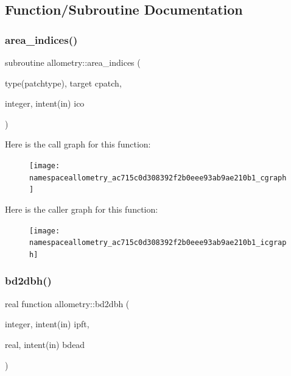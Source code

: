 \subsection{Function/\+Subroutine Documentation}
\mbox{\label{namespaceallometry_ac715c0d308392f2b0eee93ab9ae210b1}} 
\subsubsection{\texorpdfstring{area\+\_\+indices()}{area\_indices()}}
{\footnotesize\ttfamily subroutine allometry\+::area\+\_\+indices (\begin{DoxyParamCaption}\item[{type(patchtype), target}]{cpatch,  }\item[{integer, intent(in)}]{ico }\end{DoxyParamCaption})}

Here is the call graph for this function\+:
\nopagebreak
\begin{figure}[H]
\begin{center}
\leavevmode
\texttt{[image: namespaceallometry\_ac715c0d308392f2b0eee93ab9ae210b1\_cgraph]}
\end{center}
\end{figure}
Here is the caller graph for this function\+:
\nopagebreak
\begin{figure}[H]
\begin{center}
\leavevmode
\texttt{[image: namespaceallometry\_ac715c0d308392f2b0eee93ab9ae210b1\_icgraph]}
\end{center}
\end{figure}
\mbox{\label{namespaceallometry_a50fedbee3a14eb5569a62abb4a36198f}} 
\subsubsection{\texorpdfstring{bd2dbh()}{bd2dbh()}}
{\footnotesize\ttfamily real function allometry\+::bd2dbh (\begin{DoxyParamCaption}\item[{integer, intent(in)}]{ipft,  }\item[{real, intent(in)}]{bdead }\end{DoxyParamCaption})}

